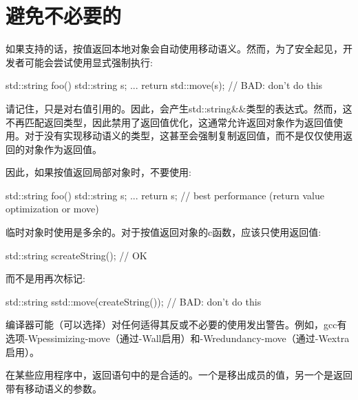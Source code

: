 \section{避免不必要的}
如果支持的话，按值返回本地对象会自动使用移动语义。然而，为了安全起见，开发者可能会尝试使用显式强制执行:

\begin{cppcode}
std::string foo()
{
	std::string s;
	...
	return std::move(s); // BAD: don’t do this
}
\end{cppcode}

请记住，只是对右值引用的。因此，会产生std::string\&\&类型的表达式。然而，这不再匹配返回类型，因此禁用了返回值优化，这通常允许返回对象作为返回值使用。对于没有实现移动语义的类型，这甚至会强制复制返回值，而不是仅仅使用返回的对象作为返回值。

因此，如果按值返回局部对象时，不要使用:

\begin{cppcode}
std::string foo()
{
	std::string s;
	...
	return s; // best performance (return value optimization or move)
}
\end{cppcode}

临时对象时使用是多余的。对于按值返回对象的c函数，应该只使用返回值:

\begin{cppcode}
std::string s{createString()}; // OK
\end{cppcode}

而不是用再次标记:

\begin{cppcode}
std::string s{std::move(createString())}; // BAD: don’t do this
\end{cppcode}

编译器可能（可以选择）对任何适得其反或不必要的使用发出警告。例如，gcc有选项-Wpessimizing-move（通过-Wall启用）和-Wredundancy-move（通过-Wextra启用）。

在某些应用程序中，返回语句中的是合适的。一个是移出成员的值，另一个是返回带有移动语义的参数。
















